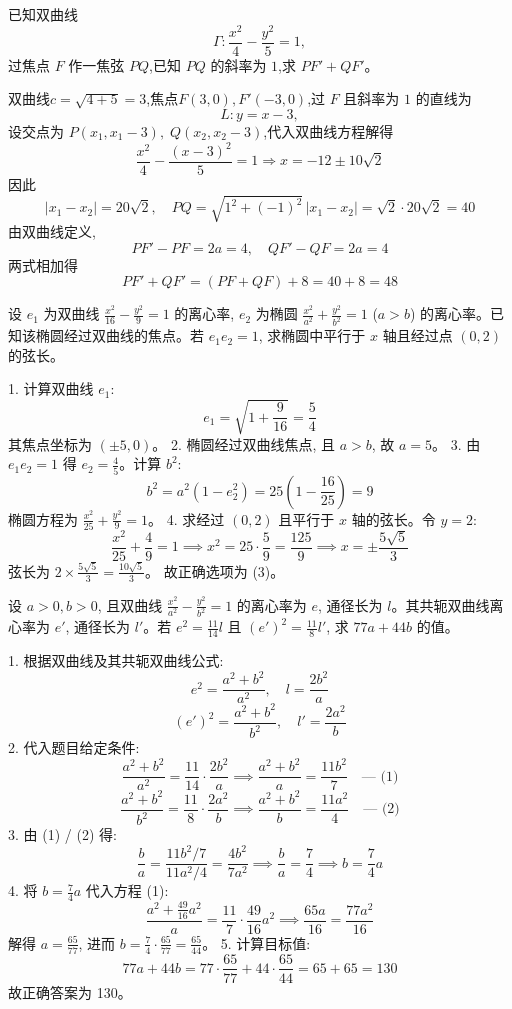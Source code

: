 \begin{questions}
    \question 已知双曲线 
    \[
    \Gamma: \dfrac{x^2}{4}-\dfrac{y^2}{5}=1,
    \]
    过焦点 $F$ 作一焦弦 $PQ$,已知 $PQ$ 的斜率为 $1$,求 $PF' + QF'$。 
    \begin{solution}
        双曲线$c=\sqrt{4+5}=3$,焦点$F(3,0), F'(-3,0)$,过 $F$ 且斜率为 $1$ 的直线为
        \[
        L: y=x-3,
        \]
        设交点为 $P(x_1,x_1-3),\;Q(x_2,x_2-3)$,代入双曲线方程解得
        \[
        \frac{x^2}{4}-\frac{(x-3)^2}{5}=1 \Rightarrow x=-12\pm 10\sqrt{2}
        \]
        因此
        \[
        |x_1-x_2|=20\sqrt{2},\quad PQ=\sqrt{1^2+(-1)^2}\,|x_1-x_2|=\sqrt{2}\cdot 20\sqrt{2}=40
        \]
        由双曲线定义,
        \[
        PF'-PF=2a=4,\quad QF'-QF=2a=4
        \]
        两式相加得
        \[
        PF'+QF'=(PF+QF)+8=40+8=48
        \]
    \end{solution}

    \question
设 $e_1$ 为双曲线 $\frac{x^2}{16} - \frac{y^2}{9} = 1$ 的离心率, $e_2$ 为椭圆 $\frac{x^2}{a^2} + \frac{y^2}{b^2} = 1$ ($a > b$) 的离心率。已知该椭圆经过双曲线的焦点。若 $e_1 e_2 = 1$, 求椭圆中平行于 $x$ 轴且经过点 $(0, 2)$ 的弦长。

\begin{solution}
1. 计算双曲线 $e_1$:
\[ e_1 = \sqrt{1 + \frac{9}{16}} = \frac{5}{4} \]
其焦点坐标为 $(\pm 5, 0)$。
2. 椭圆经过双曲线焦点, 且 $a > b$, 故 $a = 5$。
3. 由 $e_1 e_2 = 1$ 得 $e_2 = \frac{4}{5}$。计算 $b^2$:
\[ b^2 = a^2(1 - e_2^2) = 25 \left( 1 - \frac{16}{25} \right) = 9 \]
椭圆方程为 $\frac{x^2}{25} + \frac{y^2}{9} = 1$。
4. 求经过 $(0, 2)$ 且平行于 $x$ 轴的弦长。令 $y = 2$:
\[ \frac{x^2}{25} + \frac{4}{9} = 1 \implies x^2 = 25 \cdot \frac{5}{9} = \frac{125}{9} \implies x = \pm \frac{5\sqrt{5}}{3} \]
弦长为 $2 \times \frac{5\sqrt{5}}{3} = \frac{10\sqrt{5}}{3}$。
故正确选项为 (3)。
\end{solution}

\question
设 $a > 0, b > 0$, 且双曲线 $\frac{x^2}{a^2} - \frac{y^2}{b^2} = 1$ 的离心率为 $e$, 通径长为 $l$。其共轭双曲线离心率为 $e'$, 通径长为 $l'$。若 $e^2 = \frac{11}{14}l$ 且 $(e')^2 = \frac{11}{8}l'$, 求 $77a + 44b$ 的值。

\begin{solution}
1. 根据双曲线及其共轭双曲线公式:
\[ e^2 = \frac{a^2 + b^2}{a^2}, \quad l = \frac{2b^2}{a} \]
\[ (e')^2 = \frac{a^2 + b^2}{b^2}, \quad l' = \frac{2a^2}{b} \]
2. 代入题目给定条件:
\[ \frac{a^2 + b^2}{a^2} = \frac{11}{14} \cdot \frac{2b^2}{a} \implies \frac{a^2 + b^2}{a} = \frac{11b^2}{7} \quad \text{--- (1)} \]
\[ \frac{a^2 + b^2}{b^2} = \frac{11}{8} \cdot \frac{2a^2}{b} \implies \frac{a^2 + b^2}{b} = \frac{11a^2}{4} \quad \text{--- (2)} \]
3. 由 (1) / (2) 得:
\[ \frac{b}{a} = \frac{11b^2/7}{11a^2/4} = \frac{4b^2}{7a^2} \implies \frac{b}{a} = \frac{7}{4} \implies b = \frac{7}{4}a \]
4. 将 $b = \frac{7}{4}a$ 代入方程 (1):
\[ \frac{a^2 + \frac{49}{16}a^2}{a} = \frac{11}{7} \cdot \frac{49}{16}a^2 \implies \frac{65a}{16} = \frac{77a^2}{16} \]
解得 $a = \frac{65}{77}$, 进而 $b = \frac{7}{4} \cdot \frac{65}{77} = \frac{65}{44}$。
5. 计算目标值:
\[ 77a + 44b = 77 \cdot \frac{65}{77} + 44 \cdot \frac{65}{44} = 65 + 65 = 130 \]
故正确答案为 130。
\end{solution}


\end{questions}

